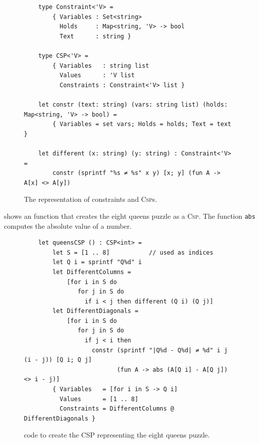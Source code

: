 \begin{figure}[!ht]
\centering
\begin{verbatim}
    type Constraint<'V> =
        { Variables : Set<string>
          Holds     : Map<string, 'V> -> bool
          Text      : string }

    type CSP<'V> =
        { Variables   : string list
          Values      : 'V list
          Constraints : Constraint<'V> list }

    let constr (text: string) (vars: string list) (holds: Map<string, 'V> -> bool) =
        { Variables = set vars; Holds = holds; Text = text }

    let different (x: string) (y: string) : Constraint<'V> =
        constr (sprintf "%s ≠ %s" x y) [x; y] (fun A -> A[x] <> A[y])
\end{verbatim}
\vspace*{-0.3cm}
\caption{The representation of constraints and \textsc{Csp}s.}
\label{fig:CSP-types}
\end{figure}

 shows an \Fsharp{} function that creates the eight queens puzzle as a
\textsc{Csp}.  The function \texttt{abs} computes the absolute value of a number.

\begin{figure}[!ht]
\centering
\begin{verbatim}
    let queensCSP () : CSP<int> =
        let S = [1 .. 8]           // used as indices
        let Q i = sprintf "Q%d" i
        let DifferentColumns =
            [for i in S do
               for j in S do
                 if i < j then different (Q i) (Q j)]
        let DifferentDiagonals =
            [for i in S do
               for j in S do
                 if j < i then
                   constr (sprintf "|Q%d - Q%d| ≠ %d" i j (i - j)) [Q i; Q j]
                          (fun A -> abs (A[Q i] - A[Q j]) <> i - j)]
        { Variables   = [for i in S -> Q i]
          Values      = [1 .. 8]
          Constraints = DifferentColumns @ DifferentDiagonals }
\end{verbatim}
\vspace*{-0.3cm}
\caption{\Fsharp{} code to create the CSP representing the eight queens puzzle.}
\label{fig:queens-csp.stlx}
\end{figure}


